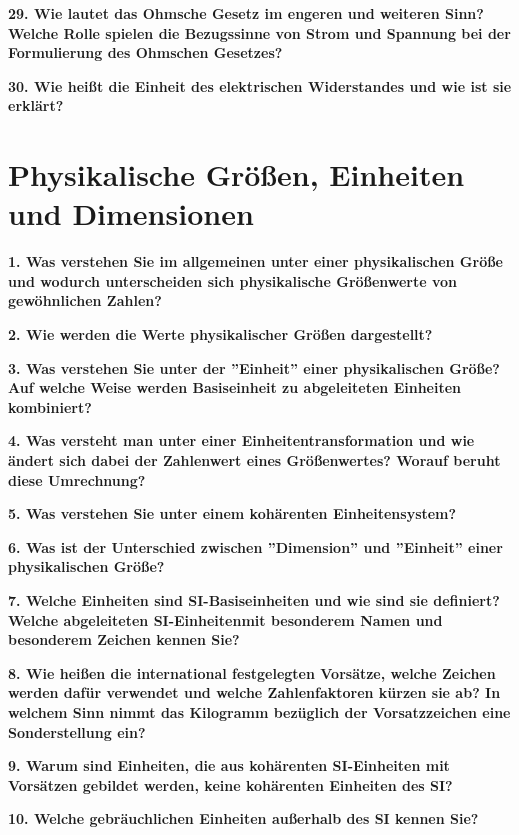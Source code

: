 \documentclass[12pt,a4paper,twoside]{book}
\newcommand{\nqu}[1]{\vspace*{10mm} \noindent \textbf{#1} \par \vspace*{1mm}}
\begin{document}
\nqu{29. Wie lautet das Ohmsche Gesetz im engeren und weiteren Sinn? Welche Rolle spielen die Bezugssinne von Strom und Spannung bei der Formulierung des Ohmschen Gesetzes?}

\nqu{30. Wie heißt die Einheit des elektrischen Widerstandes und wie ist sie erklärt?}


\chapter{Physikalische Größen, Einheiten und Dimensionen}

\nqu{1. Was verstehen Sie im allgemeinen unter einer physikalischen Größe und wodurch unterscheiden sich physikalische Größenwerte von gewöhnlichen Zahlen?}

\nqu{2. Wie werden die Werte physikalischer Größen dargestellt?}

\nqu{3. Was verstehen Sie unter der ''Einheit'' einer physikalischen Größe? Auf welche Weise werden Basiseinheit zu abgeleiteten Einheiten kombiniert?}

\nqu{4. Was versteht man unter einer Einheitentransformation und wie ändert sich dabei der Zahlenwert eines Größenwertes? Worauf beruht diese Umrechnung?}

\nqu{5. Was verstehen Sie unter einem kohärenten Einheitensystem?}

\nqu{6. Was ist der Unterschied zwischen ''Dimension'' und ''Einheit'' einer physikalischen Größe?}

\nqu{7. Welche Einheiten sind SI-Basiseinheiten und wie sind sie definiert? Welche abgeleiteten SI-Einheitenmit besonderem Namen und besonderem Zeichen kennen Sie?}

\nqu{8. Wie heißen die international festgelegten Vorsätze, welche Zeichen werden dafür verwendet und welche Zahlenfaktoren kürzen sie ab? In welchem Sinn nimmt das Kilogramm bezüglich der Vorsatzzeichen eine Sonderstellung ein?}

\nqu{9. Warum sind Einheiten, die aus kohärenten SI-Einheiten mit Vorsätzen gebildet werden, keine kohärenten Einheiten des SI?}

\nqu{10. Welche gebräuchlichen Einheiten außerhalb des SI kennen Sie?}
\end{document}
